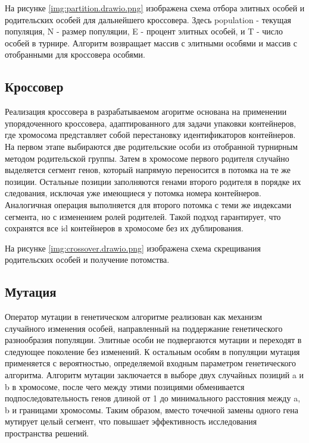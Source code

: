 \newpage
На рисунке \ref{img:partition.drawio.png} изображена схема отбора элитных особей и родительских особей для дальнейшего кроссовера. Здесь population - текущая популяция, N - размер популяции, E - процент элитных особей, и T - число особей в турнире. Алгоритм возвращает массив с элитными особями и массив с отобранными для кроссовера особями.


\newpage

\subsection{Кроссовер}
Реализация кроссовера в разрабатываемом агоритме основана на применении упорядоченного кроссовера, адаптированного для задачи упаковки контейнеров, где хромосома представляет собой перестановку идентификаторов контейнеров. На первом этапе выбираются две родительские особи из отобранной турнирным методом родительской группы. Затем в хромосоме первого родителя случайно выделяется сегмент генов, который напрямую переносится в потомка на те же позиции. Остальные позиции заполняются генами второго родителя в порядке их следования, исключая уже имеющиеся у потомка номера контейнеров. Аналогичная операция выполняется для второго потомка с теми же индексами сегмента, но с изменением ролей родителей. Такой подход гарантирует, что сохранятся все id контейнеров в хромосоме без их дублирования.

\newpage
На рисунке \ref{img:crossover.drawio.png} изображена схема скрещивания родительских особей и получение потомства. 



\subsection{Мутация}
Оператор мутации в генетическом алгоритме реализован как механизм случайного изменения особей, направленный на поддержание генетического разнообразия популяции. Элитные особи не подвергаются мутации и переходят в следующее поколение без изменений. К остальным особям в популяции мутация применяется с вероятностью, определяемой входным параметром генетического алгоритма. Алгоритм мутации заключается в выборе двух случайных позиций a и b в хромосоме, после чего между этими позициями обменивается подпоследовательность генов длиной от 1 до минимального расстояния между a, b и границами хромосомы. Таким образом, вместо точечной замены одного гена мутирует целый сегмент, что повышает эффективность исследования пространства решений.

